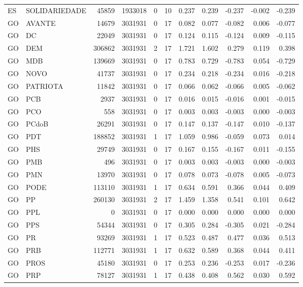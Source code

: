\begin{landscape}
\begin{longtable}{llrrrrrrrrr}
ES & SOLIDARIEDADE & 45859 & 1933018 & 0 & 10 & 0.237 & 0.239 & -0.237 & -0.002 & -0.239 \\
GO & AVANTE & 14679 & 3031931 & 0 & 17 & 0.082 & 0.077 & -0.082 & 0.006 & -0.077 \\
GO & DC & 22049 & 3031931 & 0 & 17 & 0.124 & 0.115 & -0.124 & 0.009 & -0.115 \\
GO & DEM & 306862 & 3031931 & 2 & 17 & 1.721 & 1.602 & 0.279 & 0.119 & 0.398 \\
GO & MDB & 139669 & 3031931 & 0 & 17 & 0.783 & 0.729 & -0.783 & 0.054 & -0.729 \\
GO & NOVO & 41737 & 3031931 & 0 & 17 & 0.234 & 0.218 & -0.234 & 0.016 & -0.218 \\
GO & PATRIOTA & 11842 & 3031931 & 0 & 17 & 0.066 & 0.062 & -0.066 & 0.005 & -0.062 \\
GO & PCB & 2937 & 3031931 & 0 & 17 & 0.016 & 0.015 & -0.016 & 0.001 & -0.015 \\
GO & PCO & 558 & 3031931 & 0 & 17 & 0.003 & 0.003 & -0.003 & 0.000 & -0.003 \\
GO & PCdoB & 26291 & 3031931 & 0 & 17 & 0.147 & 0.137 & -0.147 & 0.010 & -0.137 \\
GO & PDT & 188852 & 3031931 & 1 & 17 & 1.059 & 0.986 & -0.059 & 0.073 & 0.014 \\
GO & PHS & 29749 & 3031931 & 0 & 17 & 0.167 & 0.155 & -0.167 & 0.011 & -0.155 \\
GO & PMB & 496 & 3031931 & 0 & 17 & 0.003 & 0.003 & -0.003 & 0.000 & -0.003 \\
GO & PMN & 13970 & 3031931 & 0 & 17 & 0.078 & 0.073 & -0.078 & 0.005 & -0.073 \\
GO & PODE & 113110 & 3031931 & 1 & 17 & 0.634 & 0.591 & 0.366 & 0.044 & 0.409 \\
GO & PP & 260130 & 3031931 & 2 & 17 & 1.459 & 1.358 & 0.541 & 0.101 & 0.642 \\
GO & PPL & 0 & 3031931 & 0 & 17 & 0.000 & 0.000 & 0.000 & 0.000 & 0.000 \\
GO & PPS & 54344 & 3031931 & 0 & 17 & 0.305 & 0.284 & -0.305 & 0.021 & -0.284 \\
GO & PR & 93269 & 3031931 & 1 & 17 & 0.523 & 0.487 & 0.477 & 0.036 & 0.513 \\
GO & PRB & 112771 & 3031931 & 1 & 17 & 0.632 & 0.589 & 0.368 & 0.044 & 0.411 \\
GO & PROS & 45180 & 3031931 & 0 & 17 & 0.253 & 0.236 & -0.253 & 0.017 & -0.236 \\
GO & PRP & 78127 & 3031931 & 1 & 17 & 0.438 & 0.408 & 0.562 & 0.030 & 0.592 \\

\end{longtable}
\end{landscape}
